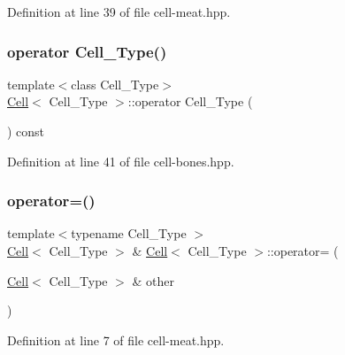 Definition at line 39 of file cell-\/meat.\+hpp.

\mbox{\label{class_cell_abe9b289bc80d4f5d0717ba9e69197c0b}} 
\subsubsection{\texorpdfstring{operator Cell\+\_\+\+Type()}{operator Cell\_Type()}}
{\footnotesize\ttfamily template$<$class Cell\+\_\+\+Type$>$ \\
\hyperlink{class_cell}{Cell}$<$ Cell\+\_\+\+Type $>$\+::operator Cell\+\_\+\+Type (\begin{DoxyParamCaption}{ }\end{DoxyParamCaption}) const\hspace{0.3cm}{\ttfamily [inline]}}



Definition at line 41 of file cell-\/bones.\+hpp.

\mbox{\label{class_cell_a6cfdc588dba9ca10a11693d644ac0c60}} 
\subsubsection{\texorpdfstring{operator=()}{operator=()}\hspace{0.1cm}{\footnotesize\ttfamily [1/2]}}
{\footnotesize\ttfamily template$<$typename Cell\+\_\+\+Type $>$ \\
\hyperlink{class_cell}{Cell}$<$ Cell\+\_\+\+Type $>$ \& \hyperlink{class_cell}{Cell}$<$ Cell\+\_\+\+Type $>$\+::operator= (\begin{DoxyParamCaption}\item[{\hyperlink{class_cell}{Cell}$<$ Cell\+\_\+\+Type $>$ \&}]{other }\end{DoxyParamCaption})}



Definition at line 7 of file cell-\/meat.\+hpp.

\mbox{\label{class_cell_a9ea03f80e1b160ca43b1db5b5792e482}} 
